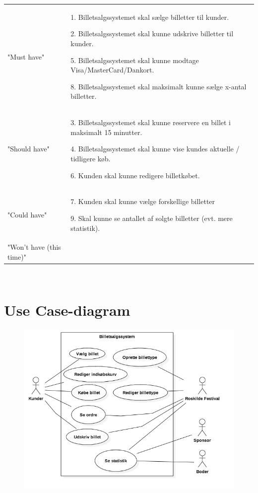\begin{tabular}{ll}
    "Must have"                 &
    1. Billetsalgssystemet skal sælge billetter til kunder.

    2. Billetsalgssystemet skal kunne udskrive billetter til kunder.

    5. Billetsalgssystemet skal kunne modtage Visa/MasterCard/Dankort.

    8. Billetsalgssystemet skal maksimalt kunne sælge x-antal billetter.

    \\

    "Should have"               & 
    3. Billetsalgssystemet skal kunne reservere en billet i maksimalt 15 minutter.

    4. Billetsalgssystemet skal kunne vise kundes aktuelle / tidligere køb.

    6. Kunden skal kunne redigere billetkøbet.

    \\

    "Could have"                & 
    7. Kunden skal kunne vælge forskellige billetter

    9. Skal kunne se antallet af solgte billetter (evt. mere statistik).

    \\

    "Won’t have (this time)"    & 
    \\

\end{tabular}
\\

\section{Use Case-diagram}
\begin{figure}[H]
    \begin{center}
        \includegraphics[width=1\textwidth]{UseCaseDiagram.png}
    \end{center}
\end{figure}

